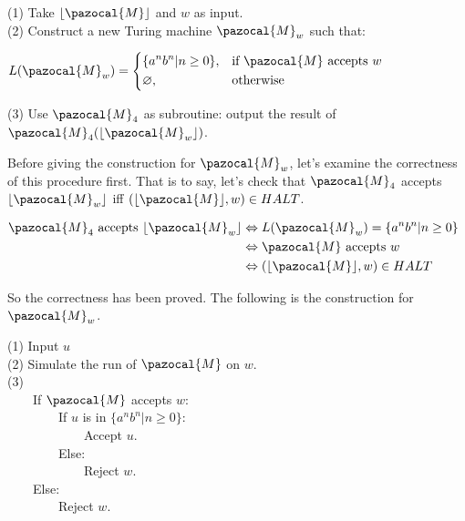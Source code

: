 \documentclass{article}
\DeclarePairedDelimiter\floor{\lfloor}{\rfloor}
\begin{document}
\noindent    (1) Take \(\floor{\pazocal{M}}\) and \(w\) as input.\\
\noindent    (2) Construct a new Turing machine \(\pazocal{M}_w\) such that:
    \begin{center}\(L(\pazocal{M}_w)=\left\{\begin{aligned}
    &\{a^nb^n|n\geq 0\}, && \text{if } \pazocal{M} \text{ accepts } w \\
    &\varnothing, && \text{otherwise}
    \end{aligned} \right.\)\end{center}
\noindent   (3) Use \(\pazocal{M}_4\) as subroutine: output the result of \(\pazocal{M}_4(\floor{\pazocal{M}_w})\).

    Before giving the construction for \(\pazocal{M}_w\), let's examine the correctness of this procedure first. That is to say, let's check that \(\pazocal{M}_4\) accepts \(\floor{\pazocal{M}_w}\) iff \((\floor{\pazocal{M}}, w) \in HALT\).

    \begin{center}\(\begin{aligned}
    \pazocal{M}_4 \text{ accepts } \floor{\pazocal{M}_w} & \Leftrightarrow L(\pazocal{M}_w) = \{a^nb^n|n \geq 0\} \\
                                               & \Leftrightarrow \pazocal{M} \text{ accepts } w \\
                                               & \Leftrightarrow (\floor{\pazocal{M}}, w) \in HALT
    \end{aligned}\)\end{center}
    So the correctness has been proved. The following is the construction for \(\pazocal{M}_w\).

\noindent(1) Input \(u\)\\
\noindent(2) Simulate the run of \(\pazocal{M}\) on \(w\).\\
\noindent(3)\\
　　If \(\pazocal{M}\) accepts \(w\):\\
　　　　If \(u\) is in \(\{a^nb^n|n\geq 0\}\):\\
　　　　　　Accept \(u\).\\
　　　　Else:\\
　　　　　　Reject \(w\).\\
　　Else:\\
　　　　Reject \(w\).
\end{document}
